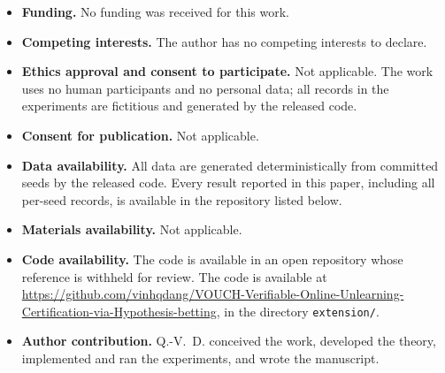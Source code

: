 \documentclass[pdflatex,sn-mathphys-num]{sn-jnl}
\theoremstyle{thmstyleone}
\theoremstyle{thmstyletwo}
\theoremstyle{thmstylethree}
\begin{document}
\begin{itemize}
\item \textbf{Funding.} No funding was received for this work.
\item \textbf{Competing interests.} The author has no competing interests to declare.
\item \textbf{Ethics approval and consent to participate.} Not applicable. The work uses
no human participants and no personal data; all records in the experiments are
fictitious and generated by the released code.
\item \textbf{Consent for publication.} Not applicable.
\item \textbf{Data availability.} All data are generated deterministically from committed
seeds by the released code. Every result reported in this paper, including all per-seed
records, is available in the repository listed below.
\item \textbf{Materials availability.} Not applicable.
\item \textbf{Code availability.}
\ifanon
The code is available in an open repository whose reference is withheld for review.
\else
The code is available at
\url{https://github.com/vinhqdang/VOUCH-Verifiable-Online-Unlearning-Certification-via-Hypothesis-betting},
in the directory \texttt{extension/}.
\fi
\item \textbf{Author contribution.} Q.-V.~D. conceived the work, developed the theory,
implemented and ran the experiments, and wrote the manuscript.
\end{itemize}


\end{document}

